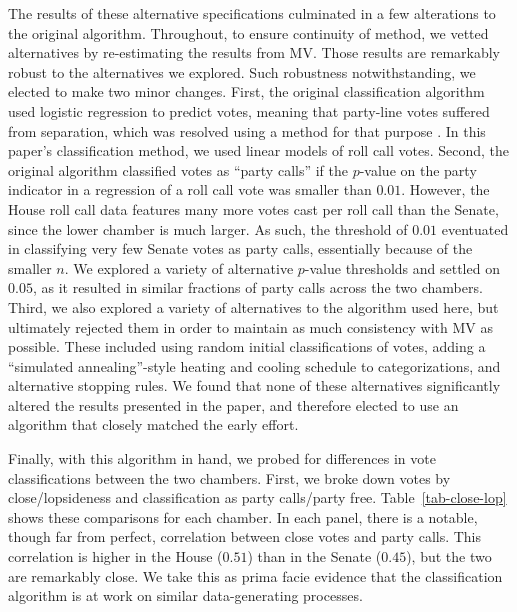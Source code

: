 \documentclass[12pt]{article}
\begin{document}
The results of these alternative specifications culminated in a few alterations to the original algorithm.  Throughout, to ensure continuity of method, we vetted alternatives by re-estimating the results from MV.  Those results are remarkably robust to the alternatives we explored.  Such robustness notwithstanding, we elected to make two minor changes.  First, the original classification algorithm used logistic regression to predict votes, meaning that party-line votes suffered from separation, which was resolved using a method for that purpose \citep{Zorn:2005}.  In this paper's classification method, we used linear models of roll call votes.  Second, the original algorithm classified votes as ``party calls'' if the $p$-value on the party indicator in a regression of a roll call vote was smaller than $0.01$.  However, the House roll call data features many more votes cast per roll call than the Senate, since the lower chamber is much larger.  As such, the threshold of $0.01$ eventuated in classifying very few Senate votes as party calls, essentially because of the smaller $n$.  We explored a variety of alternative $p$-value thresholds and settled on $0.05$, as it resulted in similar fractions of party calls across the two chambers.  Third, we also explored a variety of alternatives to the algorithm used here, but ultimately rejected them in order to maintain as much consistency with MV as possible.  These included using random initial classifications of votes, adding a ``simulated annealing''-style heating and cooling schedule to categorizations, and alternative stopping rules.  We found that none of these alternatives significantly altered the results presented in the paper, and therefore elected to use an algorithm that closely matched the early effort.

Finally, with this algorithm in hand, we probed for differences in vote classifications between the two chambers.  First, we broke down votes by close/lopsideness and classification as party calls/party free.  Table~\ref{tab-close-lop} shows these comparisons for each chamber. In each panel, there is a notable, though far from perfect, correlation between close votes and party calls.  This correlation is higher in the House ($0.51$) than in the Senate ($0.45$), but the two are remarkably close.  We take this as prima facie evidence that the classification algorithm is at work on similar data-generating processes.
\end{document}
